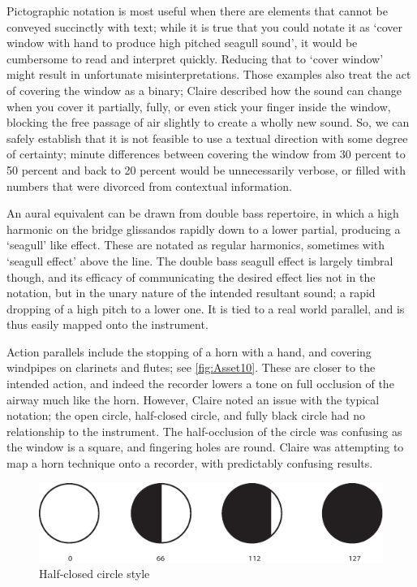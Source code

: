 Pictographic notation is most useful when there are elements that cannot be conveyed succinctly with text; while it is true that you could notate it as `cover window with hand to produce high pitched seagull sound', it would be cumbersome to read and interpret quickly. 
Reducing that to `cover window' might result in unfortunate misinterpretations. 
Those examples also treat the act of covering the window as a binary; Claire described how the sound can change when you cover it partially, fully, or even stick your finger inside the window, blocking the free passage of air slightly to create a wholly new sound. 
So, we can safely establish that it is not feasible to use a textual direction with some degree of certainty; 
minute differences between covering the window from 30 percent to 50 percent and back to 20 percent would be unnecessarily verbose, or filled with numbers that were divorced from contextual information.

An aural equivalent can be drawn from double bass repertoire, in which a high harmonic on the bridge glissandos rapidly down to a lower partial, producing a `seagull' like effect. 
These are notated as regular harmonics, sometimes with `seagull effect' above the line. 
The double bass seagull effect is largely timbral though, and its efficacy of communicating the desired effect lies not in the notation, but in the unary nature of the intended resultant sound; a rapid dropping of a high pitch to a lower one. 
It is tied to a real world parallel, and is thus easily mapped onto the instrument.

Action parallels include the stopping of a horn with a hand, and covering windpipes on clarinets and flutes; see \autoref{fig:Asset10}. 
These are closer to the intended action, and indeed the recorder lowers a tone on full occlusion of the airway much like the horn. 
However, Claire noted an issue with the typical notation; the open circle, half-closed circle, and fully black circle had no relationship to the instrument. 
The half-occlusion of the circle was confusing as the window is a square, and fingering holes are round.
Claire was attempting to map a horn technique onto a recorder, with predictably confusing results. 

\begin{figure}
\includegraphics[width=\linewidth]{./resources/Asset 10.pdf}
\caption{Half-closed circle style}\label{fig:Asset10}
\end{figure}


